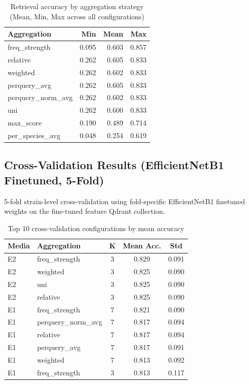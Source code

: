 \begin{table}[H]
\centering
\caption{Retrieval accuracy by aggregation strategy (Mean, Min, Max across all configurations)}
\label{tab:app_by_agg}
\small
\begin{tabular}{@{}l r r r@{}}
\toprule
\textbf{Aggregation} & \textbf{Min} & \textbf{Mean} & \textbf{Max} \\
\midrule
freq\_strength      & 0.095 & 0.603 & 0.857 \\
relative            & 0.262 & 0.605 & 0.833 \\
weighted            & 0.262 & 0.602 & 0.833 \\
perquery\_avg       & 0.262 & 0.605 & 0.833 \\
perquery\_norm\_avg  & 0.262 & 0.602 & 0.833 \\
uni                 & 0.262 & 0.600 & 0.833 \\
max\_score           & 0.190 & 0.489 & 0.714 \\
per\_species\_avg     & 0.048 & 0.254 & 0.619 \\
\bottomrule
\end{tabular}
\end{table}

\subsection{Cross-Validation Results (EfficientNetB1 Finetuned, 5-Fold)}

5-fold strain-level cross-validation using fold-specific EfficientNetB1 finetuned
weights on the fine-tuned feature Qdrant collection.

\begin{table}[H]
\centering
\caption{Top 10 cross-validation configurations by mean accuracy}
\label{tab:cv_top10}
\small
\begin{tabular}{@{}l l c c c@{}}
\toprule
\textbf{Media} & \textbf{Aggregation} & \textbf{K} & \textbf{Mean Acc.} & \textbf{Std} \\
\midrule
E2 & freq\_strength      & 3  & 0.829 & 0.091 \\
E2 & weighted            & 3  & 0.825 & 0.090 \\
E2 & uni                 & 3  & 0.825 & 0.090 \\
E2 & relative            & 3  & 0.825 & 0.090 \\
E1 & freq\_strength      & 7  & 0.821 & 0.090 \\
E1 & perquery\_norm\_avg  & 7  & 0.817 & 0.094 \\
E1 & relative            & 7  & 0.817 & 0.094 \\
E1 & perquery\_avg       & 7  & 0.817 & 0.091 \\
E1 & weighted            & 7  & 0.813 & 0.092 \\
E1 & freq\_strength      & 3  & 0.813 & 0.117 \\
\bottomrule
\end{tabular}
\end{table}

